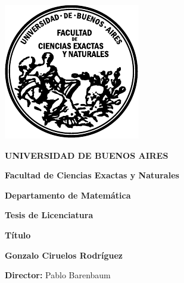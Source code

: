 
\thispagestyle{empty}

\begin {center}

\includegraphics[scale=.4,natwidth=100,natheight=100]{template_tesis/logofcen.pdf}

\medskip
\textbf{UNIVERSIDAD DE BUENOS AIRES}

\smallskip

\textbf{Facultad de Ciencias Exactas y Naturales}

\smallskip

\textbf{Departamento de Matem\'atica}

\vspace{3.5cm}

\textbf{\large Tesis de Licenciatura}


\vspace{1.5cm}

\textbf{\LARGE Título}

\vspace{1.5cm}


\textbf{\large Gonzalo Ciruelos Rodríguez}

\end {center}


\vspace{1.5cm}

\noindent \textbf{Director:} Pablo Barenbaum


\vspace{3cm}

